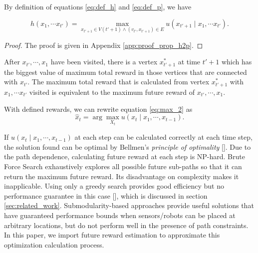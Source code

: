 By definition of equations \eqref{eq:def_h} and \eqref{eq:def_p}, we have 
\begin{propty}
\label{prop:h2p}
\begin{equation}
\label{eq:h2p}
h( x_{1}, \cdots x_{t'} ) = \max_{x_{t'+1} \in V(t'+1) \land (v_{t'}, x_{t'+1}) \in E} u(x_{t'+1} \mid x_{1}, \cdots x_{t'} ).
\end{equation}
\begin{proof}
The proof is given in Appendix \ref{app:proof_prop_h2p}.
\end{proof}
\end{propty}
After $ x_{t'}, \cdots , x_{1} $ have been visited, there is a vertex $ x^{*}_{t'+1} $ at time $ t' + 1 $ which has the biggest value of maximum total reward in those vertices that are connected with $ x_{t'} $. 
The maximum total reward that is calculated from vertex $ x^{*}_{t'+1} $ with $ x_{1}, \cdots x_{t'} $ visited is equivalent to the maximum future reward of $ x_{t'}, \cdots , x_{1} $.

With defined rewards, we can rewrite equation \eqref{eq:max_2} as
\begin{equation}
\label{eq:max_21}
\hat{x}_{t} = \arg \max_{X_{t}} u(x_{t} \mid x_{1} , \cdots , x_{t-1}).
\end{equation}

If $ u(x_{t} \mid x_{1} , \cdots , x_{t-1}) $ at each step can be calculated correctly at each time step, the solution found can be optimal by Bellmen's \emph{principle of optimality} [\cite{lewis1986optimal}].
Due to the path dependence, calculating future reward at each step is NP-hard.
Brute Force Search exhaustively explores all possible future sub-paths so that it can return the maximum future reward.
Its disadvantage on complexity makes it inapplicable.
Using only a greedy search provides good efficiency but no performance guarantee in this case [\cite{krause2012submodular}], which is discussed in section \ref{sec:related_work}.
Submodularity-based approaches provide useful solutions that have guaranteed performance bounds when sensors/robots can be placed at arbitrary locations, but do not perform well in the presence of path constraints.
In this paper, we import future reward estimation to approximate this optimization calculation process.
